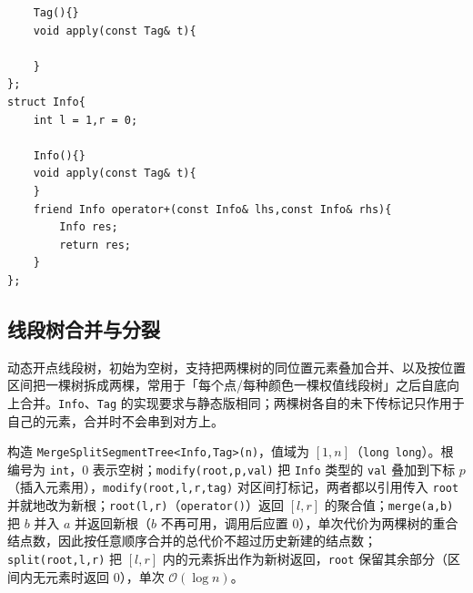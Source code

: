 \begin{lstlisting}
    Tag(){}
    void apply(const Tag& t){

    }
};
struct Info{
    int l = 1,r = 0;

    Info(){}
    void apply(const Tag& t){
    }
    friend Info operator+(const Info& lhs,const Info& rhs){
        Info res;
        return res;
    }
};
\end{lstlisting}

\subsection{线段树合并与分裂}

动态开点线段树，初始为空树，支持把两棵树的同位置元素叠加合并、以及按位置区间把一棵树拆成两棵，常用于「每个点/每种颜色一棵权值线段树」之后自底向上合并。\texttt{Info}、\texttt{Tag} 的实现要求与静态版相同；两棵树各自的未下传标记只作用于自己的元素，合并时不会串到对方上。

构造 \texttt{MergeSplitSegmentTree<Info,Tag>(n)}，值域为 $[1,n]$（\texttt{long long}）。根编号为 \texttt{int}，$0$ 表示空树；\texttt{modify(root,p,val)} 把 \texttt{Info} 类型的 \texttt{val} 叠加到下标 $p$（插入元素用），\texttt{modify(root,l,r,tag)} 对区间打标记，两者都以引用传入 \texttt{root} 并就地改为新根；\texttt{root(l,r)}（\texttt{operator()}）返回 $[l,r]$ 的聚合值；\texttt{merge(a,b)} 把 $b$ 并入 $a$ 并返回新根（$b$ 不再可用，调用后应置 $0$），单次代价为两棵树的重合结点数，因此按任意顺序合并的总代价不超过历史新建的结点数；\texttt{split(root,l,r)} 把 $[l,r]$ 内的元素拆出作为新树返回，\texttt{root} 保留其余部分（区间内无元素时返回 $0$），单次 $\mathcal{O}(\log n)$。

